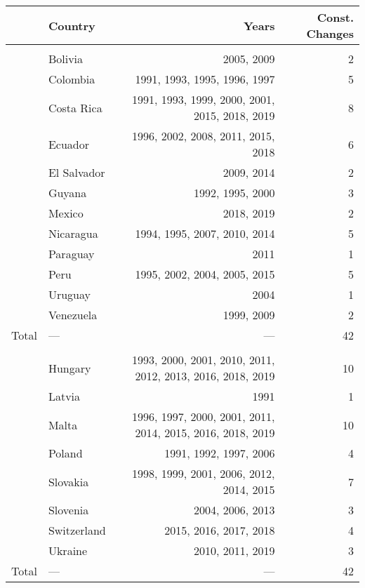 \begin{longtable}{l|lrr}
\toprule
\multicolumn{1}{l}{} & \textbf{Country} & \textbf{Years} & \textbf{Const. Changes} \\ 
\midrule\addlinespace[2.5pt]
\multicolumn{4}{l}{Latin America} \\ 
\midrule\addlinespace[2.5pt]
 & Bolivia & 2005, 2009 & 2 \\ 
 & Colombia & 1991, 1993, 1995, 1996, 1997 & 5 \\ 
 & Costa Rica & 1991, 1993, 1999, 2000, 2001, 2015, 2018, 2019 & 8 \\ 
 & Ecuador & 1996, 2002, 2008, 2011, 2015, 2018 & 6 \\ 
 & El Salvador & 2009, 2014 & 2 \\ 
 & Guyana & 1992, 1995, 2000 & 3 \\ 
 & Mexico & 2018, 2019 & 2 \\ 
 & Nicaragua & 1994, 1995, 2007, 2010, 2014 & 5 \\ 
 & Paraguay & 2011 & 1 \\ 
 & Peru & 1995, 2002, 2004, 2005, 2015 & 5 \\ 
 & Uruguay & 2004 & 1 \\ 
 & Venezuela & 1999, 2009 & 2 \\ 
\midrule 
Total & — & — & 42 \\ 
\midrule\addlinespace[2.5pt]
\multicolumn{4}{l}{Europe} \\ 
\midrule\addlinespace[2.5pt]
 & Hungary & 1993, 2000, 2001, 2010, 2011, 2012, 2013, 2016, 2018, 2019 & 10 \\ 
 & Latvia & 1991 & 1 \\ 
 & Malta & 1996, 1997, 2000, 2001, 2011, 2014, 2015, 2016, 2018, 2019 & 10 \\ 
 & Poland & 1991, 1992, 1997, 2006 & 4 \\ 
 & Slovakia & 1998, 1999, 2001, 2006, 2012, 2014, 2015 & 7 \\ 
 & Slovenia & 2004, 2006, 2013 & 3 \\ 
 & Switzerland & 2015, 2016, 2017, 2018 & 4 \\ 
 & Ukraine & 2010, 2011, 2019 & 3 \\ 
\midrule 
Total & — & — & 42 \\ 
\bottomrule
\end{longtable}

